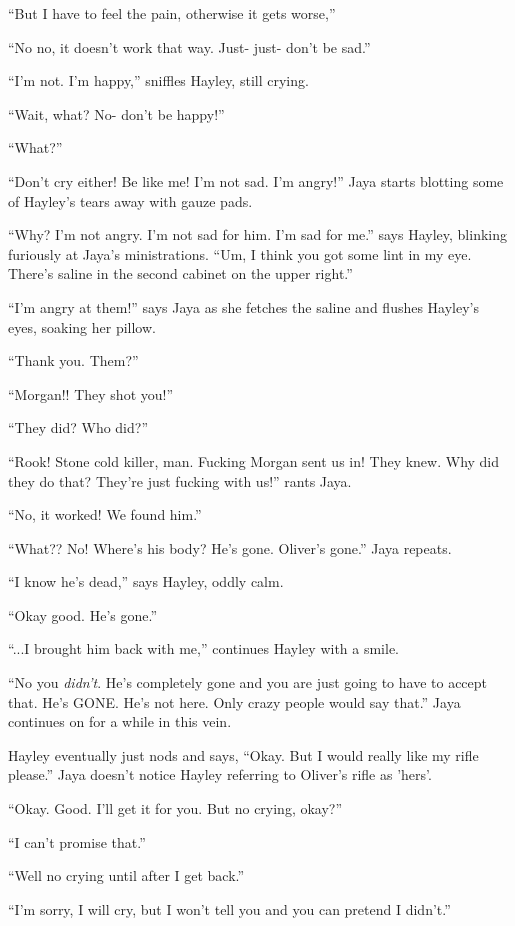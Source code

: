 ``But I have to feel the pain, otherwise it gets worse,''

``No no, it doesn't work that way.  Just- just- don't be sad.''

``I'm not.  I'm happy,'' sniffles Hayley, still crying.

``Wait, what?  No- don't be happy!''

``What?''

``Don't cry either!  Be like me!  I'm not sad.  I'm angry!''  Jaya starts blotting some of Hayley's tears away with gauze pads.

``Why?  I'm not angry.  I'm not sad for him.  I'm sad for me.'' says Hayley, blinking furiously at Jaya's ministrations.  ``Um, I think you got some lint in my eye.  There's saline in the second cabinet on the upper right.''

``I'm angry at them!'' says Jaya as she fetches the saline and flushes Hayley's eyes, soaking her pillow.

``Thank you.  Them?''

``Morgan!!  They shot you!''

``They did?  Who did?''

``Rook!  Stone cold killer, man.  Fucking Morgan sent us in!  They knew.  Why did they do that?  They're just fucking with us!'' rants Jaya.

``No, it worked!  We found him.''

``What??  No!  Where's his body? He's gone.  Oliver's gone.'' Jaya repeats.

``I know he's dead,'' says Hayley, oddly calm.

``Okay good. He's gone.''

``...I brought him back with me,'' continues Hayley with a smile.

``No you \textit{didn't}.  He's completely gone and you are just going to have to accept that.  He's GONE.  He's not here.  Only crazy people would say that.''  Jaya continues on for a while in this vein.

Hayley eventually just nods and says, ``Okay.  But I would really like my rifle please.''  Jaya doesn't notice Hayley referring to Oliver's rifle as 'hers'.

``Okay.  Good.  I'll get it for you.  But no crying, okay?''

``I can't promise that.''

``Well no crying until after I get back.''

``I'm sorry, I will cry, but I won't tell you and you can pretend I didn't.''

